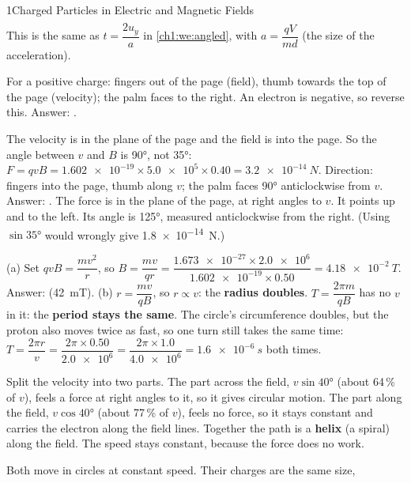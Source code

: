 \begin{chapteranswers}{1}{Charged Particles in Electric and Magnetic Fields}
\begin{align*}
        \end{align*}
        This is the same as $t = \dfrac{2u_y}{a}$ in \cref{ch1:we:angled}, with
        $a = \dfrac{qV}{md}$ (the size of the acceleration).
  \item For a positive charge: fingers out of the page (field), thumb towards
        the top of the page (velocity); the palm faces to the right. An electron
        is negative, so reverse this. Answer: .
  \item The velocity is in the plane of the page and the field is into the
        page. So the angle between $v$ and $B$ is \ang{90}, not \ang{35}:
        $F = qvB = \num{1.602e-19} \times \num{5.0e5} \times 0.40 = \qty{3.2e-14}{N}$.
        Direction: fingers into the page, thumb along $v$; the palm faces
        \ang{90} anticlockwise from $v$. Answer: .
        The force is in the plane of the page, at right angles to $v$. It
        points up and to the left. Its angle is \ang{125}, measured
        anticlockwise from the right. (Using $\sin\ang{35}$ would wrongly give
        \qty{1.8e-14}{N}.)
  \item (a) Set $qvB = \dfrac{mv^2}{r}$, so
        $B = \dfrac{mv}{qr} = \dfrac{\num{1.673e-27} \times \num{2.0e6}}{\num{1.602e-19} \times 0.50}
        = \qty{4.18e-2}{T}$. Answer:  (\qty{42}{mT}).
        (b) $r = \dfrac{mv}{qB}$, so $r \propto v$: the \textbf{radius doubles}.
        $T = \dfrac{2\pi m}{qB}$ has no $v$ in it: the \textbf{period stays the
        same}. The circle's circumference doubles, but the proton also moves
        twice as fast, so one turn still takes the same time:
        $T = \dfrac{2\pi r}{v} = \dfrac{2\pi \times 0.50}{\num{2.0e6}}
        = \dfrac{2\pi \times 1.0}{\num{4.0e6}} = \qty{1.6e-6}{s}$ both times.
  \item Split the velocity into two parts. The part across the field,
        $v\sin\ang{40}$ (about 64\,\% of $v$), feels a force at right angles to
        it, so it gives circular motion. The part along the field,
        $v\cos\ang{40}$ (about 77\,\% of $v$), feels no force, so it stays
        constant and carries the electron along the field lines. Together the
        path is a \textbf{helix} (a spiral) along the field. The speed stays
        constant, because the force does no work.
  \item Both move in circles at constant speed. Their charges are the same size,

\end{chapteranswers}
